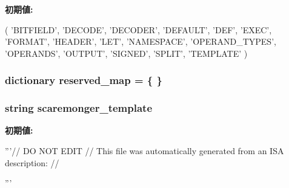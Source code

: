 \label{classisa__parser_1_1ISAParser_a7c0da508b820c6b4db51430d694f6d8b}
{\bfseries 初期値:}
\begin{DoxyCode}
(
        'BITFIELD', 'DECODE', 'DECODER', 'DEFAULT', 'DEF', 'EXEC', 'FORMAT',
        'HEADER', 'LET', 'NAMESPACE', 'OPERAND_TYPES', 'OPERANDS',
        'OUTPUT', 'SIGNED', 'SPLIT', 'TEMPLATE'
        )
\end{DoxyCode}
\hypertarget{classisa__parser_1_1ISAParser_a2fce270f6ee4bafd620b1b2f00cd9b79}{
\subsubsection[{reserved\_\-map}]{\setlength{\rightskip}{0pt plus 5cm}dictionary {\bf reserved\_\-map} = \{ \}}}
\label{classisa__parser_1_1ISAParser_a2fce270f6ee4bafd620b1b2f00cd9b79}
\hypertarget{classisa__parser_1_1ISAParser_a1ffc37bc1a95ff6b59642af9b3ac16bc}{
\subsubsection[{scaremonger\_\-template}]{\setlength{\rightskip}{0pt plus 5cm}string {\bf scaremonger\_\-template}}}
\label{classisa__parser_1_1ISAParser_a1ffc37bc1a95ff6b59642af9b3ac16bc}
{\bfseries 初期値:}
\begin{DoxyCode}
'''// DO NOT EDIT
// This file was automatically generated from an ISA description:
//   %

'''
\end{DoxyCode}
\hypertarget{classisa__parser_1_1ISAParser_a001ef9e857118ccf6a7720cdc2f8e61e}{
\subsubsection[{splits}]{}}
\label{classisa__parser_1_1ISAParser_a001ef9e857118ccf6a7720cdc2f8e61e}
